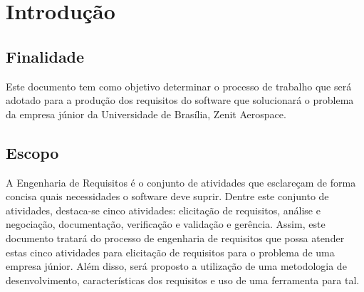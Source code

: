 \chapter[Introdução]{Introdução}

\section{Finalidade}
Este documento tem como objetivo determinar o processo de trabalho que será adotado para a produção dos requisitos do software que solucionará o problema da empresa júnior da Universidade de Brasília, Zenit Aerospace.
\section{Escopo}
A Engenharia de Requisitos é o conjunto de atividades que esclareçam de forma concisa quais necessidades o software deve suprir. Dentre este conjunto de atividades, destaca-se cinco atividades: elicitação de requisitos, análise e negociação, documentação, verificação e validação e gerência. Assim, este documento tratará do processo de engenharia de requisitos que possa atender estas cinco atividades para elicitação de requisitos para o problema de uma empresa júnior. Além disso, será proposto a utilização de uma metodologia de desenvolvimento, características dos requisitos e uso de uma ferramenta para tal.

